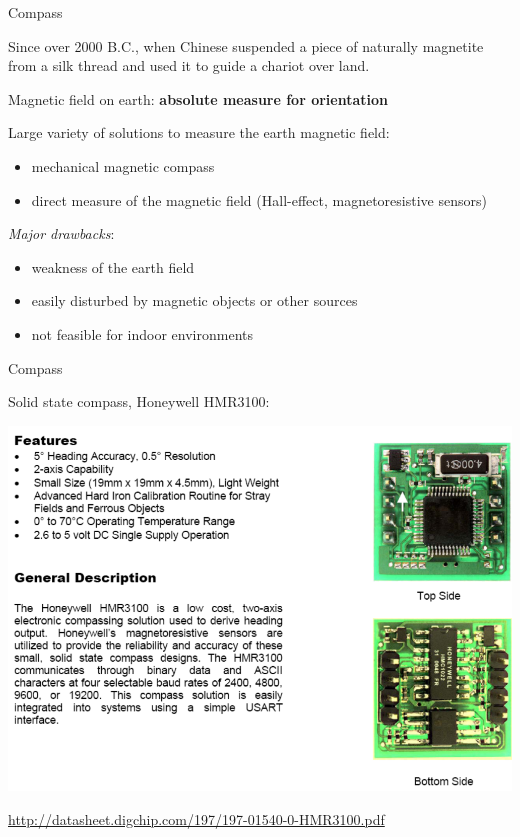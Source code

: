 \documentclass[compress]{beamer}
\begin{document}
\begin{frame}{Compass}

    Since over 2000 B.C., when Chinese suspended a piece of naturally magnetite from a silk
    thread and used it to guide a chariot over land.

    Magnetic field on earth: {\bf absolute measure for orientation}

    Large variety of solutions to measure the earth magnetic field:
    \begin{itemize}
        \item mechanical magnetic compass
        \item direct measure of the magnetic field (Hall-effect, magnetoresistive
              sensors)
    \end{itemize}

    \emph{Major drawbacks}:

    \begin{itemize}
        \item weakness of the earth field
        \item easily disturbed by magnetic objects or other sources
        \item not feasible for indoor environments
    \end{itemize}

\end{frame}

\begin{frame}{Compass}

    Solid state compass, \eg Honeywell HMR3100:

    \begin{center}
        \includegraphics[width=0.7\linewidth]{compass}
    \end{center}
    \small
    \url{http://datasheet.digchip.com/197/197-01540-0-HMR3100.pdf}

\end{frame}
\end{document}
